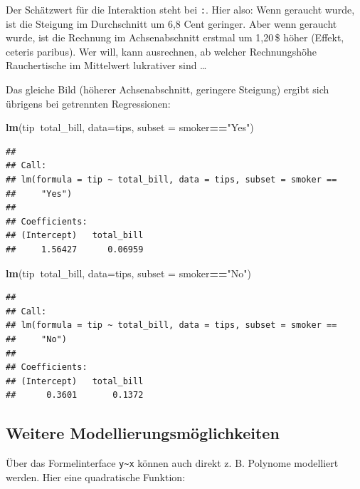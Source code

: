 \documentclass[12pt,ngerman,paper=a4,pagesize,DIV=13]{scrreprt}
\newenvironment{Shaded}{\begin{snugshade}}{\end{snugshade}}
\newcommand{\DataTypeTok}[1]{\textcolor[rgb]{0.13,0.29,0.53}{#1}}
\newcommand{\KeywordTok}[1]{\textcolor[rgb]{0.13,0.29,0.53}{\textbf{#1}}}
\newcommand{\NormalTok}[1]{#1}
\newcommand{\OperatorTok}[1]{\textcolor[rgb]{0.81,0.36,0.00}{\textbf{#1}}}
\newcommand{\StringTok}[1]{\textcolor[rgb]{0.31,0.60,0.02}{#1}}
\begin{document}
Der Schätzwert für die Interaktion steht bei \texttt{:}. Hier also: Wenn
geraucht wurde, ist die Steigung im Durchschnitt um 6,8 Cent geringer.
Aber wenn geraucht wurde, ist die Rechnung im Achsenabschnitt erstmal um
1,20\(\,\)\$ höher (Effekt, ceteris paribus). Wer will, kann ausrechnen,
ab welcher Rechnungshöhe Rauchertische im Mittelwert lukrativer sind
\dots 

Das gleiche Bild (höherer Achsenabschnitt, geringere Steigung) ergibt
sich übrigens bei getrennten Regressionen:

\begin{Shaded}
\begin{Highlighting}[]
\KeywordTok{lm}\NormalTok{(tip}\OperatorTok{~}\NormalTok{total_bill, }\DataTypeTok{data=}\NormalTok{tips, }\DataTypeTok{subset =}\NormalTok{ smoker}\OperatorTok{==}\StringTok{"Yes"}\NormalTok{)}
\end{Highlighting}
\end{Shaded}

\begin{verbatim}
## 
## Call:
## lm(formula = tip ~ total_bill, data = tips, subset = smoker == 
##     "Yes")
## 
## Coefficients:
## (Intercept)   total_bill  
##     1.56427      0.06959
\end{verbatim}

\begin{Shaded}
\begin{Highlighting}[]
\KeywordTok{lm}\NormalTok{(tip}\OperatorTok{~}\NormalTok{total_bill, }\DataTypeTok{data=}\NormalTok{tips, }\DataTypeTok{subset =}\NormalTok{ smoker}\OperatorTok{==}\StringTok{"No"}\NormalTok{)}
\end{Highlighting}
\end{Shaded}

\begin{verbatim}
## 
## Call:
## lm(formula = tip ~ total_bill, data = tips, subset = smoker == 
##     "No")
## 
## Coefficients:
## (Intercept)   total_bill  
##      0.3601       0.1372
\end{verbatim}

\hypertarget{weitere-modellierungsmoglichkeiten}{%
\subsection{Weitere
Modellierungsmöglichkeiten}\label{weitere-modellierungsmoglichkeiten}}

Über das Formelinterface \texttt{y\textasciitilde{}x} können auch direkt
z. B. Polynome modelliert werden. Hier eine quadratische Funktion:
\end{document}
